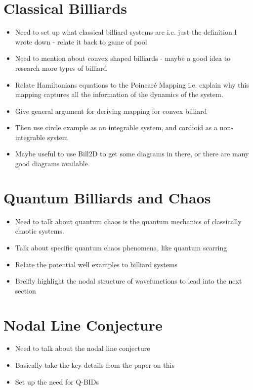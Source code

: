 \documentclass[12pt,a4paper]{amsart}
\begin{document}
\section*{Classical Billiards}
\begin{itemize}
    \item Need to set up what classical billiard systems are i.e. just the definition I wrote down - relate it back to game of pool
    \item Need to mention about convex shaped billiards - maybe a good idea to research more types of billiard
    \item Relate Hamiltonians equations to the Poincaré Mapping i.e. explain why this  mapping captures all the information of the dynamics of the system.
    \item Give general argument for deriving mapping for convex billiard
    \item Then use circle example as an integrable system, and cardioid as a non-integrable system
    \item Maybe useful to use Bill2D to get some diagrams in there, or there are many good diagrams available.
\end{itemize}

\section*{Quantum Billiards and Chaos}
\begin{itemize}
    \item Need to talk about quantum chaos is the quantum mechanics of classically chaotic systems.
    \item Talk about specific quantum chaos phenomena, like quantum scarring
    \item Relate the potential well examples to billiard systems
    \item Breifly highlight the nodal structure of wavefunctions to lead into the next section
\end{itemize}

\section*{Nodal Line Conjecture}
\begin{itemize}
    \item Need to talk about the nodal line conjecture
    \item Basically take the key details from the paper on this
    \item Set up the need for Q-BIDs
\end{itemize}
\end{document}
